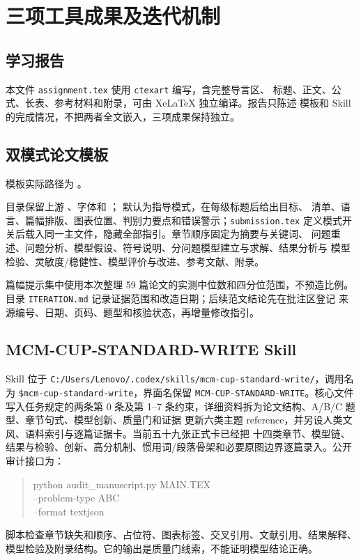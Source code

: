 \documentclass[UTF8,a4paper,12pt]{ctexart}
\begin{document}
\section{三项工具成果及迭代机制}

\subsection{学习报告}

本文件 \texttt{assignment.tex} 使用 \texttt{ctexart} 编写，含完整导言区、
标题、正文、公式、长表、参考材料和附录，可由 XeLaTeX 独立编译。报告只陈述
模板和 Skill 的完成情况，不把两者全文嵌入，三项成果保持独立。

\subsection{双模式论文模板}

模板实际路径为 。\par
目录保留上游
、字体和
； 默认为指导模式，在每级标题后给出目标、
清单、语言、篇幅排版、图表位置、判别力要点和错误警示；\texttt{submission.tex}
定义模式开关后载入同一主文件，隐藏全部指引。章节顺序固定为摘要与关键词、
问题重述、问题分析、模型假设、符号说明、分问题模型建立与求解、结果分析与
模型检验、灵敏度/稳健性、模型评价与改进、参考文献、附录。

篇幅提示集中使用本次整理 59 篇论文的实测中位数和四分位范围，不预造比例。目录
\texttt{ITERATION.md} 记录证据范围和改造日期；后续范文结论先在批注区登记
来源编号、日期、页码、题型和核验状态，再增量修改指引。

\subsection{MCM-CUP-STANDARD-WRITE Skill}

Skill 位于
\texttt{C:/Users/Lenovo/.codex/skills/mcm-cup-standard-write/}，调用名为
\texttt{\$mcm-cup-standard-write}，界面名保留
\texttt{MCM-CUP-STANDARD-WRITE}。核心文件写入任务规定的两条第 0 条及第 1--7
条约束，详细资料拆为论文结构、A/B/C 题型、章节句式、模型创新、质量门和证据
更新六类主题 reference，并另设人类文风、语料索引与逐篇证据卡。当前五十九张正式卡已经把
十四类章节、模型链、结果与检验、创新、高分机制、惯用词/段落骨架和必要原图边界逐篇录入。公开审计接口为：
\begin{quote}
\small\ttfamily
python audit\_manuscript.py MAIN.TEX\\
\hspace*{1em}--problem-type A\textbar B\textbar C\\
\hspace*{1em}--format text\textbar json
\end{quote}
脚本检查章节缺失和顺序、占位符、图表标签、交叉引用、文献引用、结果解释、
模型检验及附录结构。它的输出是质量门线索，不能证明模型结论正确。
\end{document}
